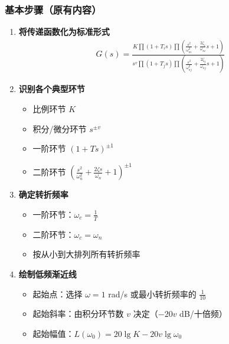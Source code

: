 \subsubsection{基本步骤（原有内容）}
\begin{enumerate}
    \item \textbf{将传递函数化为标准形式}
    \begin{align*}
    G(s) = \frac{K\prod(1+T_i s)\prod(\frac{s^2}{\omega_{ni}^2}+\frac{2\zeta_i}{\omega_{ni}}s+1)}{s^v\prod(1+T_j s)\prod(\frac{s^2}{\omega_{nj}^2}+\frac{2\zeta_j}{\omega_{nj}}s+1)}
    \end{align*}
    
    \item \textbf{识别各个典型环节}
    \begin{itemize}
        \item 比例环节 $K$
        \item 积分/微分环节 $s^{\pm v}$
        \item 一阶环节 $(1+Ts)^{\pm 1}$
        \item 二阶环节 $(\frac{s^2}{\omega_n^2}+\frac{2\zeta s}{\omega_n}+1)^{\pm 1}$
    \end{itemize}
    
    \item \textbf{确定转折频率}
    \begin{itemize}
        \item 一阶环节：$\omega_c = \frac{1}{T}$
        \item 二阶环节：$\omega_c = \omega_n$
        \item 按从小到大排列所有转折频率
    \end{itemize}
    
    \item \textbf{绘制低频渐近线}
    \begin{itemize}
        \item 起始点：选择 $\omega = 1$ rad/s 或最小转折频率的 $\frac{1}{10}$
        \item 起始斜率：由积分环节数 $v$ 决定（$-20v$ dB/十倍频）
        \item 起始幅值：$L(\omega_0) = 20\lg K - 20v\lg\omega_0$
    \end{itemize}
    

\end{enumerate}
